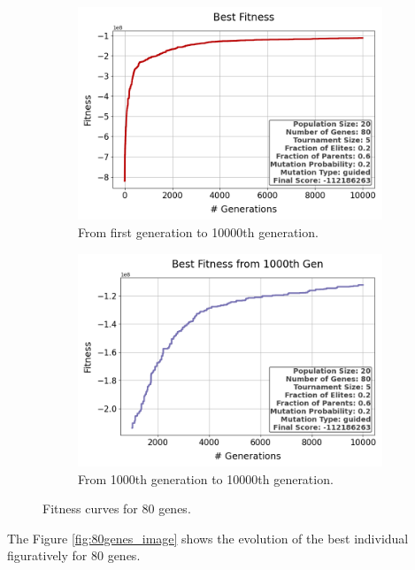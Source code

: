 \documentclass{assignment}
\begin{document}
\begin{figure}[h!]
    \begin{subfigure}{0.5\textwidth}
        \includegraphics[width=\textwidth]{figures/best_fitness_output_20_80_5_0.2_0.6_0.2_guided.png}
        \caption{From first generation to 10000th generation.}
    \end{subfigure}\hfill
    \begin{subfigure}{0.5\textwidth}
        \includegraphics[width=\textwidth]{figures/best_fitness_1000_output_20_80_5_0.2_0.6_0.2_guided.png}
        \caption{From 1000th generation to 10000th generation.}
    \end{subfigure}
    \caption{Fitness curves for 80 genes.}
\label{fig:80genes}
\end{figure}

The Figure \ref{fig:80genes_image} shows the evolution of the best individual figuratively for 80 genes.
\end{document}
